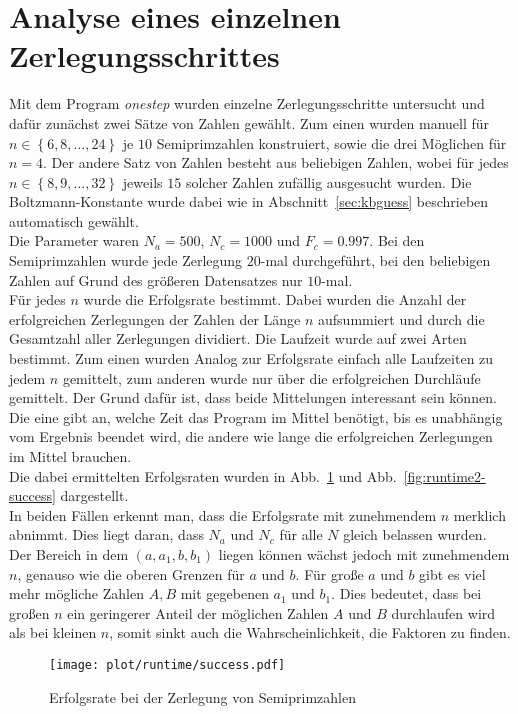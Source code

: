 \section{Analyse eines einzelnen Zerlegungsschrittes}
Mit dem Program \textit{onestep} wurden einzelne Zerlegungsschritte untersucht und dafür zunächst zwei Sätze von Zahlen gewählt. Zum einen wurden manuell für $n\in\left\{6,8,\dots,24\right\}$ je $10$ Semiprimzahlen konstruiert, sowie die drei Möglichen für $n=4$. Der andere Satz von Zahlen besteht aus beliebigen Zahlen, wobei für jedes $n\in\left\{8,9,\dots,32\right\}$ jeweils $15$ solcher Zahlen zufällig ausgesucht wurden. Die Boltzmann-Konstante wurde dabei wie in Abschnitt~\ref{sec:kbguess} beschrieben automatisch gewählt.\\
Die Parameter waren $N_a=500$, $N_c=1000$ und $F_c=0.997$. Bei den Semiprimzahlen wurde jede Zerlegung $20$-mal durchgeführt, bei den beliebigen Zahlen auf Grund des größeren Datensatzes nur $10$-mal. \\
Für jedes $n$ wurde die Erfolgsrate bestimmt. Dabei wurden die Anzahl der erfolgreichen Zerlegungen der Zahlen der Länge $n$ aufsummiert und durch die Gesamtzahl aller Zerlegungen dividiert. Die Laufzeit wurde auf zwei Arten bestimmt. Zum einen wurden Analog zur Erfolgsrate einfach alle Laufzeiten zu jedem $n$ gemittelt, zum anderen wurde nur über die erfolgreichen Durchläufe gemittelt. Der Grund dafür ist, dass beide Mittelungen interessant sein können. Die eine gibt an, welche Zeit das Program im Mittel benötigt, bis es unabhängig vom Ergebnis beendet wird, die andere wie lange die erfolgreichen Zerlegungen im Mittel brauchen. \\
Die dabei ermittelten Erfolgsraten wurden in Abb.~\ref{fig:runtime-success} und Abb.~\ref{fig:runtime2-success} dargestellt. \\
In beiden Fällen erkennt man, dass die Erfolgsrate mit zunehmendem $n$ merklich abnimmt. Dies liegt daran, dass $N_a$ und $N_c$ für alle $N$ gleich belassen wurden. Der Bereich in dem $\left(a,a_1,b,b_1\right)$ liegen können wächst jedoch mit zunehmendem $n$, genauso wie die oberen Grenzen für $a$ und $b$. Für große $a$ und $b$ gibt es viel mehr mögliche Zahlen $A, B$ mit gegebenen $a_1$ und $b_1$. Dies bedeutet, dass bei großen $n$ ein geringerer Anteil der möglichen Zahlen $A$ und $B$ durchlaufen wird als bei kleinen $n$, somit sinkt auch die Wahrscheinlichkeit, die Faktoren zu finden.
\begin{figure}[ht]
		\centering
		\texttt{[image: plot/runtime/success.pdf]}
		\caption{Erfolgsrate bei der Zerlegung von Semiprimzahlen}\label{fig:runtime-success}
\end{figure}
